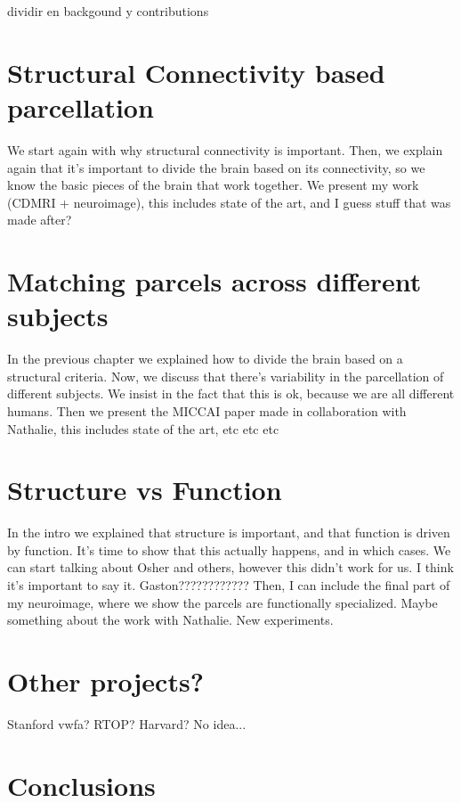 dividir en backgound y contributions

\section{Structural Connectivity based parcellation}
We start again with why structural connectivity is important.
Then, we explain again that it's important to divide the brain based on its connectivity, so we know the basic pieces of the brain that work together.
We present my work (CDMRI + neuroimage), this includes state of the art, and I guess stuff that was made after?

\section{Matching parcels across different subjects}
In the previous chapter we explained how to divide the brain based on a structural criteria.
Now, we discuss that there's variability in the parcellation of different subjects.
We insist in the fact that this is ok, because we are all different humans. 
Then we present the MICCAI paper made in collaboration with Nathalie, this includes state of the art, etc etc etc

\section{Structure vs Function}
In the intro we explained that structure is important, and that function is driven by function.
It's time to show that this actually happens, and in which cases.
We can start talking about Osher and others, however this didn't work for us.
I think it's important to say it.
Gaston????????????
Then, I can include the final part of my neuroimage, where we show the parcels are functionally specialized.
Maybe something about the work with Nathalie.
New experiments.

\section{Other projects?}
Stanford vwfa? RTOP? Harvard? No idea...

\section{Conclusions}
